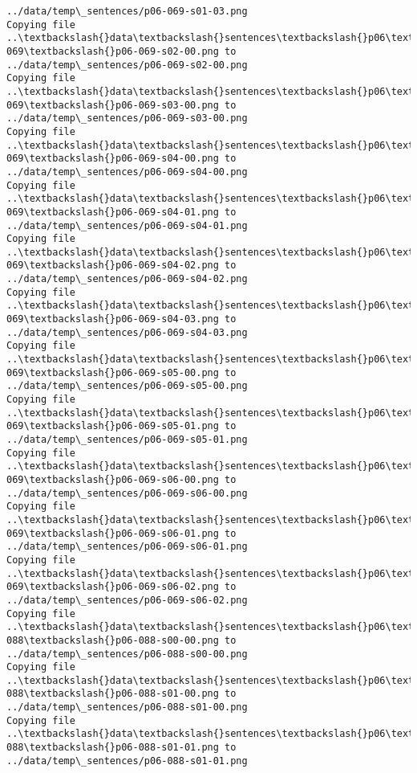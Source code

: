 \documentclass[11pt]{article}
\begin{document}
\begin{Verbatim}[commandchars=\\\{\}]
../data/temp\_sentences/p06-069-s01-03.png
Copying file ..\textbackslash{}data\textbackslash{}sentences\textbackslash{}p06\textbackslash{}p06-069\textbackslash{}p06-069-s02-00.png to
../data/temp\_sentences/p06-069-s02-00.png
Copying file ..\textbackslash{}data\textbackslash{}sentences\textbackslash{}p06\textbackslash{}p06-069\textbackslash{}p06-069-s03-00.png to
../data/temp\_sentences/p06-069-s03-00.png
Copying file ..\textbackslash{}data\textbackslash{}sentences\textbackslash{}p06\textbackslash{}p06-069\textbackslash{}p06-069-s04-00.png to
../data/temp\_sentences/p06-069-s04-00.png
Copying file ..\textbackslash{}data\textbackslash{}sentences\textbackslash{}p06\textbackslash{}p06-069\textbackslash{}p06-069-s04-01.png to
../data/temp\_sentences/p06-069-s04-01.png
Copying file ..\textbackslash{}data\textbackslash{}sentences\textbackslash{}p06\textbackslash{}p06-069\textbackslash{}p06-069-s04-02.png to
../data/temp\_sentences/p06-069-s04-02.png
Copying file ..\textbackslash{}data\textbackslash{}sentences\textbackslash{}p06\textbackslash{}p06-069\textbackslash{}p06-069-s04-03.png to
../data/temp\_sentences/p06-069-s04-03.png
Copying file ..\textbackslash{}data\textbackslash{}sentences\textbackslash{}p06\textbackslash{}p06-069\textbackslash{}p06-069-s05-00.png to
../data/temp\_sentences/p06-069-s05-00.png
Copying file ..\textbackslash{}data\textbackslash{}sentences\textbackslash{}p06\textbackslash{}p06-069\textbackslash{}p06-069-s05-01.png to
../data/temp\_sentences/p06-069-s05-01.png
Copying file ..\textbackslash{}data\textbackslash{}sentences\textbackslash{}p06\textbackslash{}p06-069\textbackslash{}p06-069-s06-00.png to
../data/temp\_sentences/p06-069-s06-00.png
Copying file ..\textbackslash{}data\textbackslash{}sentences\textbackslash{}p06\textbackslash{}p06-069\textbackslash{}p06-069-s06-01.png to
../data/temp\_sentences/p06-069-s06-01.png
Copying file ..\textbackslash{}data\textbackslash{}sentences\textbackslash{}p06\textbackslash{}p06-069\textbackslash{}p06-069-s06-02.png to
../data/temp\_sentences/p06-069-s06-02.png
Copying file ..\textbackslash{}data\textbackslash{}sentences\textbackslash{}p06\textbackslash{}p06-088\textbackslash{}p06-088-s00-00.png to
../data/temp\_sentences/p06-088-s00-00.png
Copying file ..\textbackslash{}data\textbackslash{}sentences\textbackslash{}p06\textbackslash{}p06-088\textbackslash{}p06-088-s01-00.png to
../data/temp\_sentences/p06-088-s01-00.png
Copying file ..\textbackslash{}data\textbackslash{}sentences\textbackslash{}p06\textbackslash{}p06-088\textbackslash{}p06-088-s01-01.png to
../data/temp\_sentences/p06-088-s01-01.png

\end{Verbatim}
\end{document}
